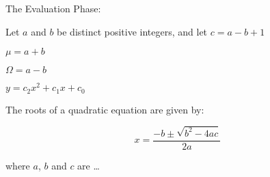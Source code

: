 The Evaluation Phase:

Let $a$ and $b$ be distinct positive integers, and let $c = a - b + 1$

$\mu = a + b $


$\Omega = a - b $

$y = c_2 x^2 + c_1 x + c_0 $

The roots of a quadratic equation are given by:

\begin{equation}
x = \frac{-b \pm \sqrt{b^2 - 4ac}} {2a}
\end{equation}

where $a$, $b$ and $c$ are \ldots
